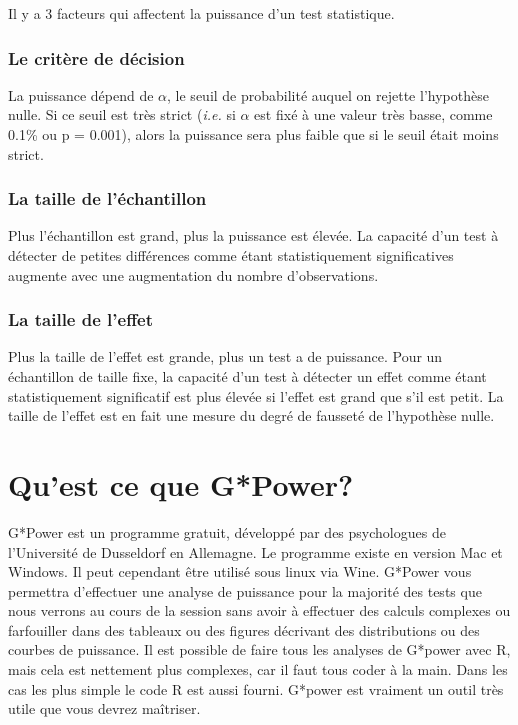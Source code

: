 \documentclass[
  12pt,
]{book}
\begin{document}
Il y a 3 facteurs qui affectent la puissance d'un test statistique.

\hypertarget{le-crituxe8re-de-duxe9cision}{%
\subsubsection*{Le critère de décision}\label{le-crituxe8re-de-duxe9cision}}

La puissance dépend de \(\alpha\), le seuil de probabilité auquel on rejette l'hypothèse nulle.
Si ce seuil est très strict (\emph{i.e.} si \(\alpha\) est fixé à une valeur très basse, comme 0.1\% ou p = 0.001), alors la puissance sera plus faible que si le seuil était moins strict.

\hypertarget{la-taille-de-luxe9chantillon}{%
\subsubsection*{La taille de l'échantillon}\label{la-taille-de-luxe9chantillon}}

Plus l'échantillon est grand, plus la puissance est élevée.
La capacité d'un test à détecter de petites différences comme étant statistiquement significatives augmente avec une augmentation du nombre d'observations.

\hypertarget{la-taille-de-leffet}{%
\subsubsection*{La taille de l'effet}\label{la-taille-de-leffet}}

Plus la taille de l'effet est grande, plus un test a de puissance.
Pour un échantillon de taille fixe, la capacité d'un test à détecter un effet comme étant statistiquement significatif est plus élevée si l'effet est grand que s'il est petit.
La taille de l'effet est en fait une mesure du degré de fausseté de l'hypothèse nulle.

\hypertarget{quest-ce-que-gpower}{%
\section{Qu'est ce que G*Power?}\label{quest-ce-que-gpower}}

G*Power est un programme gratuit, développé par des psychologues de l'Université de Dusseldorf en Allemagne.
Le programme existe en version Mac et Windows.
Il peut cependant être utilisé sous linux via Wine.
G*Power vous permettra d'effectuer une analyse de puissance pour la majorité des tests que nous verrons au cours de la session sans avoir à effectuer des calculs complexes ou farfouiller dans des tableaux ou des figures décrivant des distributions ou des courbes de puissance.
Il est possible de faire tous les analyses de G*power avec R, mais cela est nettement plus complexes, car il faut tous coder à la main. Dans les cas les plus simple le code R est aussi fourni.
G*power est vraiment un outil très utile que vous devrez maîtriser.
\end{document}
